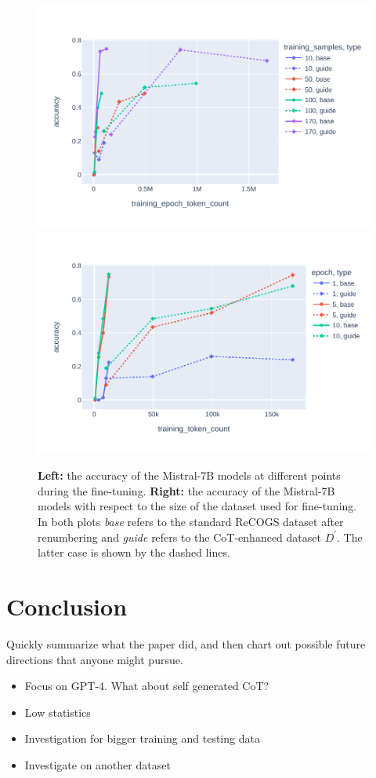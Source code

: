 \documentclass[11pt]{article}
\begin{document}
    \begin{figure}
        \centering
        \includegraphics[width=0.45\linewidth]{../plots/accuracy_vs_epochtoken.pdf}
        \includegraphics[width=0.45\linewidth]{../plots/accuracy_vs_trainingtoken.pdf}
        \caption{
            \textbf{Left:} the accuracy of the Mistral-7B models at different points during the fine-tuning.
            \textbf{Right:} the accuracy of the Mistral-7B models with respect to the size of the dataset used for fine-tuning.\\
            In both plots \emph{base} refers to the standard ReCOGS dataset after renumbering and \emph{guide}
            refers to the CoT-enhanced dataset $D^\prime$. The latter case is shown by the dashed lines.
        }
        \label{fig:acc_vs_token}
    \end{figure}

    \section{Conclusion}

    Quickly summarize what the paper did, and then chart out possible future directions that anyone might pursue.

    \begin{itemize}
        \item Focus on GPT-4. What about self generated CoT?
        \item Low statistics
        \item Investigation for bigger training and testing data
        \item Investigate on another dataset
    \end{itemize}
\end{document}
